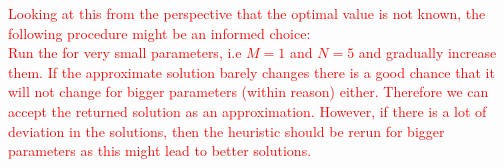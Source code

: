 \documentclass[12pt,a4paper]{article}
\theoremstyle{mythm}
\begin{document}
\textcolor{red}{
Looking at this from the perspective that the optimal value is not known, the following procedure might be an informed choice: \\
Run the \BH for very small parameters, i.e $ M = 1 $ and $ N = 5 $ and gradually increase them.
If the approximate solution barely changes there is a good chance that it will not change for bigger parameters (within reason) either.
Therefore we can accept the returned solution as an approximation.
However, if there is a lot of deviation in the solutions, then the heuristic should be rerun for bigger parameters as this might lead to better solutions.
}



\listoftodos[Notes]
\end{document}
